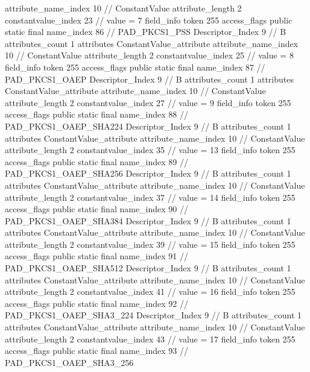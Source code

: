 {{{{{{{					attribute_name_index	10		// ConstantValue
					attribute_length	2
					constantvalue_index	23		// value = 7
				}
				}
			}
			field_info {
				token	255
				access_flags	public static final
				name_index	86		// PAD_PKCS1_PSS
				Descriptor_Index	9		// B
				attributes_count	1
				attributes {
				ConstantValue_attribute {
					attribute_name_index	10		// ConstantValue
					attribute_length	2
					constantvalue_index	25		// value = 8
				}
				}
			}
			field_info {
				token	255
				access_flags	public static final
				name_index	87		// PAD_PKCS1_OAEP
				Descriptor_Index	9		// B
				attributes_count	1
				attributes {
				ConstantValue_attribute {
					attribute_name_index	10		// ConstantValue
					attribute_length	2
					constantvalue_index	27		// value = 9
				}
				}
			}
			field_info {
				token	255
				access_flags	public static final
				name_index	88		// PAD_PKCS1_OAEP_SHA224
				Descriptor_Index	9		// B
				attributes_count	1
				attributes {
				ConstantValue_attribute {
					attribute_name_index	10		// ConstantValue
					attribute_length	2
					constantvalue_index	35		// value = 13
				}
				}
			}
			field_info {
				token	255
				access_flags	public static final
				name_index	89		// PAD_PKCS1_OAEP_SHA256
				Descriptor_Index	9		// B
				attributes_count	1
				attributes {
				ConstantValue_attribute {
					attribute_name_index	10		// ConstantValue
					attribute_length	2
					constantvalue_index	37		// value = 14
				}
				}
			}
			field_info {
				token	255
				access_flags	public static final
				name_index	90		// PAD_PKCS1_OAEP_SHA384
				Descriptor_Index	9		// B
				attributes_count	1
				attributes {
				ConstantValue_attribute {
					attribute_name_index	10		// ConstantValue
					attribute_length	2
					constantvalue_index	39		// value = 15
				}
				}
			}
			field_info {
				token	255
				access_flags	public static final
				name_index	91		// PAD_PKCS1_OAEP_SHA512
				Descriptor_Index	9		// B
				attributes_count	1
				attributes {
				ConstantValue_attribute {
					attribute_name_index	10		// ConstantValue
					attribute_length	2
					constantvalue_index	41		// value = 16
				}
				}
			}
			field_info {
				token	255
				access_flags	public static final
				name_index	92		// PAD_PKCS1_OAEP_SHA3_224
				Descriptor_Index	9		// B
				attributes_count	1
				attributes {
				ConstantValue_attribute {
					attribute_name_index	10		// ConstantValue
					attribute_length	2
					constantvalue_index	43		// value = 17
				}
				}
			}
			field_info {
				token	255
				access_flags	public static final
				name_index	93		// PAD_PKCS1_OAEP_SHA3_256
}}}}}
